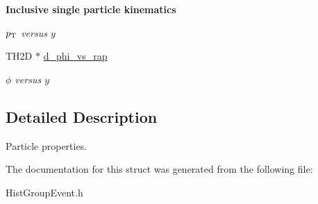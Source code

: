 \begin{Indent}{\bf Inclusive single particle kinematics}
\begin{CompactItemize}
\begin{CompactList}\small\item\em $p_{\rm T}$ versus $y$ \item\end{CompactList}\item 
\hypertarget{structHistGroupEvent_1_1__particle_645f998d3aa8cf94b1f931b87f6b5ab8}{
TH2D $\ast$ \hyperlink{structHistGroupEvent_1_1__particle_645f998d3aa8cf94b1f931b87f6b5ab8}{d\_\-phi\_\-vs\_\-rap}}
\label{structHistGroupEvent_1_1__particle_645f998d3aa8cf94b1f931b87f6b5ab8}

\begin{CompactList}\small\item\em $\phi$ versus $y$ \item\end{CompactList}\end{CompactItemize}
\end{Indent}


\subsection{Detailed Description}
Particle properties. 



The documentation for this struct was generated from the following file:\begin{CompactItemize}
\item 
Hist\-Group\-Event.h\end{CompactItemize}
